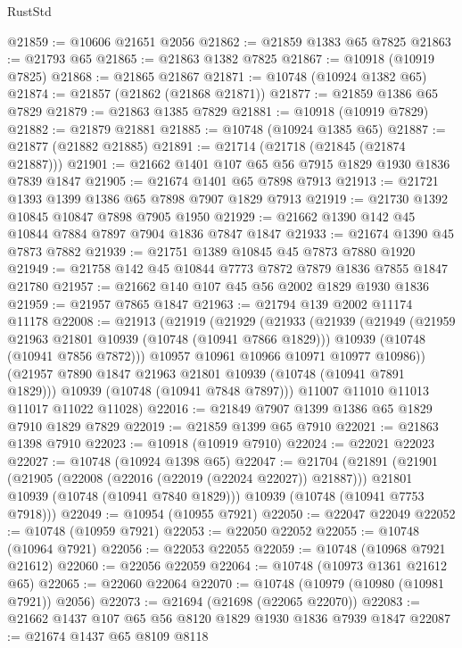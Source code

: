 \begin{lexlean}{RustStd}
\begin{coremodule}
{\begin{coremodule}
{{{{{@21859 := @10606 @21651 @2056
@21862 := @21859 @1383 @65 @7825
@21863 := @21793 @65
@21865 := @21863 @1382 @7825
@21867 := @10918 (@10919 @7825)
@21868 := @21865 @21867
@21871 := @10748 (@10924 @1382 @65)
@21874 := @21857 (@21862 (@21868 @21871))
@21877 := @21859 @1386 @65 @7829
@21879 := @21863 @1385 @7829
@21881 := @10918 (@10919 @7829)
@21882 := @21879 @21881
@21885 := @10748 (@10924 @1385 @65)
@21887 := @21877 (@21882 @21885)
@21891 := @21714 (@21718 (@21845 (@21874 @21887)))
@21901 := @21662 @1401 @107 @65 @56 @7915 @1829 @1930 @1836 @7839 @1847
@21905 := @21674 @1401 @65 @7898 @7913
@21913 := @21721 @1393 @1399 @1386 @65 @7898 @7907 @1829 @7913
@21919 := @21730 @1392 @10845 @10847 @7898 @7905 @1950
@21929 := @21662 @1390 @142 @45 @10844 @7884 @7897 @7904 @1836 @7847 @1847
@21933 := @21674 @1390 @45 @7873 @7882
@21939 := @21751 @1389 @10845 @45 @7873 @7880 @1920
@21949 := @21758 @142 @45 @10844 @7773 @7872 @7879 @1836 @7855 @1847 @21780
@21957 := @21662 @140 @107 @45 @56 @2002 @1829 @1930 @1836
@21959 := @21957 @7865 @1847
@21963 := @21794 @139 @2002 @11174 @11178
@22008 := @21913
    (@21919
      (@21929
        (@21933
          (@21939
            (@21949
              (@21959 @21963 @21801 @10939 (@10748 (@10941 @7866 @1829)))
              @10939
              (@10748 (@10941 @7856 @7872)))
            @10957
            @10961
            @10966
            @10971
            @10977
            @10986))
        (@21957 @7890 @1847 @21963 @21801 @10939 (@10748 (@10941 @7891 @1829)))
        @10939
        (@10748 (@10941 @7848 @7897)))
      @11007
      @11010
      @11013
      @11017
      @11022
      @11028)
@22016 := @21849 @7907 @1399 @1386 @65 @1829 @7910 @1829 @7829
@22019 := @21859 @1399 @65 @7910
@22021 := @21863 @1398 @7910
@22023 := @10918 (@10919 @7910)
@22024 := @22021 @22023
@22027 := @10748 (@10924 @1398 @65)
@22047 := @21704
    (@21891
      (@21901
        (@21905 (@22008 (@22016 (@22019 (@22024 @22027)) @21887)))
        @21801
        @10939
        (@10748 (@10941 @7840 @1829)))
      @10939
      (@10748 (@10941 @7753 @7918)))
@22049 := @10954 (@10955 @7921)
@22050 := @22047 @22049
@22052 := @10748 (@10959 @7921)
@22053 := @22050 @22052
@22055 := @10748 (@10964 @7921)
@22056 := @22053 @22055
@22059 := @10748 (@10968 @7921 @21612)
@22060 := @22056 @22059
@22064 := @10748 (@10973 @1361 @21612 @65)
@22065 := @22060 @22064
@22070 := @10748 (@10979 (@10980 (@10981 @7921)) @2056)
@22073 := @21694 (@21698 (@22065 @22070))
@22083 := @21662 @1437 @107 @65 @56 @8120 @1829 @1930 @1836 @7939 @1847
@22087 := @21674 @1437 @65 @8109 @8118
}}}}}
\end{coremodule}}
\end{coremodule}
\end{lexlean}
